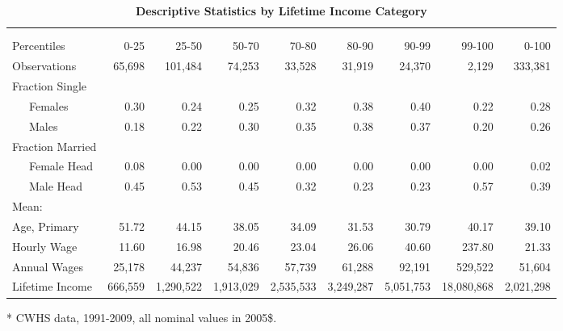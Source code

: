   \begin{table}[htbp] \centering \captionsetup{width=6.0in}
  \caption{\label{tab:li_group_stats}\textbf{Descriptive Statistics by Lifetime Income Category}}
    \begin{threeparttable}
    \begin{tabular}{>{\scriptsize}l |>{\scriptsize}r >{\scriptsize}r >{\scriptsize}r >{\scriptsize}r >{\scriptsize}r >{\scriptsize}r >{\scriptsize}r >{\scriptsize}r}
      \hline\hline
      \multicolumn{1}{c}{\scriptsize{Lifetime Income}} & & & & & & & & \\
      \multicolumn{1}{c}{\scriptsize{Category:}} & \multicolumn{1}{c}{\scriptsize{1}} & \multicolumn{1}{c}{\scriptsize{2}} & \multicolumn{1}{c}{\scriptsize{3}} & \multicolumn{1}{c}{\scriptsize{4}} & \multicolumn{1}{c}{\scriptsize{5}} & \multicolumn{1}{c}{\scriptsize{6}} & \multicolumn{1}{c}{\scriptsize{7}} & \multicolumn{1}{c}{\scriptsize{All}} \\
      \hline
      Percentiles & 0-25  & 25-50 & 50-70 & 70-80 & 80-90 & 90-99 & 99-100 & 0-100 \\
      Observations & 65,698 & 101,484 & 74,253 & 33,528 & 31,919 & 24,370 & 2,129 & 333,381 \\
      Fraction Single & & & & & & & & \\
      \ \ \ Females & 0.30  & 0.24  & 0.25  & 0.32  & 0.38  & 0.40  & 0.22  & 0.28 \\
      \ \ \  Males & 0.18  & 0.22  & 0.30  & 0.35  & 0.38  & 0.37  & 0.20  & 0.26 \\
      Fraction Married & & & & & & & & \\
      \ \ \ Female Head & 0.08  & 0.00  & 0.00  & 0.00  & 0.00  & 0.00  & 0.00  & 0.02 \\
      \ \ \ Male Head & 0.45  & 0.53  & 0.45  & 0.32  & 0.23  & 0.23  & 0.57  & 0.39 \\
      Mean: & & & & & & & & \\
      Age, Primary & 51.72 & 44.15 & 38.05 & 34.09 & 31.53 & 30.79 & 40.17 & 39.10 \\
      Hourly Wage & 11.60 & 16.98 & 20.46 & 23.04 & 26.06 & 40.60 & 237.80 & 21.33 \\
      Annual Wages & 25,178 & 44,237 & 54,836 & 57,739 & 61,288 & 92,191 & 529,522 & 51,604 \\
      Lifetime Income & 666,559 & 1,290,522 & 1,913,029 & 2,535,533 & 3,249,287 & 5,051,753 & 18,080,868 & 2,021,298 \\
      \hline\hline
    \end{tabular}%
    \begin{tablenotes}
      \tiny{\item[*] CWHS data, 1991-2009, all nominal values in 2005\$.}
    \end{tablenotes}
    \end{threeparttable}
  \end{table}

